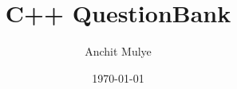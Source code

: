 \newpage
\thispagestyle{empty} %
\title{C++ QuestionBank}
\author{Anchit Mulye}
\date{\today}
\maketitle

\tableofcontents
\newpage